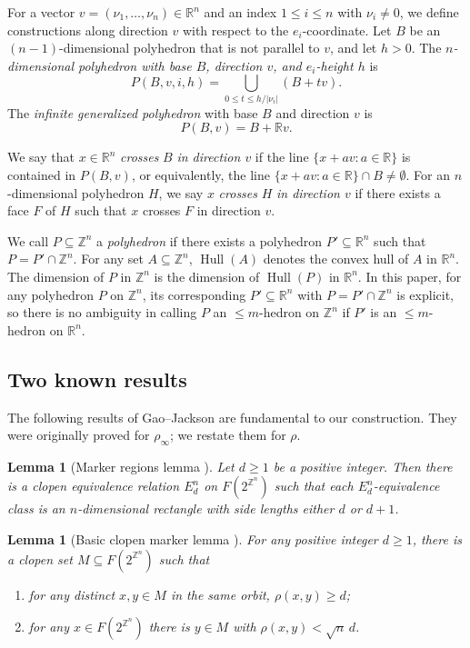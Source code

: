 \documentclass[10pt,a4paper]{amsart}
\newtheorem{lemma}[theorem]{Lemma}
\newcommand{\Z}{\mathbb Z}
\newcommand{\R}{\mathbb R}
\DeclareMathOperator{\Hull}{Hull}
\begin{document}
For a vector $v=(\nu_1,\dots,\nu_n)\in\mathbb{R}^n$ and an index
$1\leq i\leq n$ with $\nu_i\neq 0$, we define constructions along direction
$v$ with respect to the $e_i$-coordinate. Let $B$ be an $(n-1)$-dimensional
polyhedron that is not parallel to $v$, and let $h>0$. The {\em $n$-dimensional polyhedron with base $B$,
direction $v$, and $e_i$-height $h$} is
\[
P(B, v, i, h)=\bigcup_{0\leq t\leq h/|\nu_i|} (B+tv).
\]
The {\em infinite generalized polyhedron} with base $B$ and direction $v$ is
\[
P(B, v)=B+\mathbb{R}v.
\]

We say that $x\in\mathbb{R}^n$ {\em crosses} $B$ {\em in direction $v$} if
the line $\{x+av\colon a\in\mathbb{R}\}$ is contained in $P(B,v)$, or equivalently, the line $\{x+av\colon a\in\mathbb{R}\}\cap B\neq\emptyset$. For an
$n$-dimensional polyhedron $H$, we say $x$ {\em crosses} $H$ {\em in
direction $v$} if there exists a face $F$ of $H$ such that $x$ crosses $F$
in direction $v$.

We call $P\subseteq\mathbb{Z}^n$ a {\em polyhedron} if there exists a polyhedron $P'\subseteq\mathbb{R}^n$ such that $P=P'\cap\mathbb{Z}^n$. For any set $A\subseteq\mathbb{Z}^n$,
$\Hull(A)$ denotes the convex hull of $A$ in $\mathbb{R}^n$. The dimension of $P$ in $\Z^n$ is the dimension of $\Hull(P)$ in $\R^n$. In this paper, for any polyhedron $P$ on $\Z^n$, its corresponding $P'\subseteq\R^n$ with $P=P'\cap\Z^n$ is explicit, so there is no ambiguity in calling $P$ an $\leq\!\! m$-hedron on $\Z^n$ if $P'$ is an $\leq\!\! m$-hedron on $\R^n$.

\subsection{Two known results}

The following results of Gao--Jackson \cite{GJ15} are fundamental
to our construction. They were originally proved for $\rho_\infty$; we restate them for $\rho$.

\begin{lemma}[Marker regions lemma {\cite[Theorem 3.1]{GJ15}}]\label{lem:markerregions}
Let $d\geq 1$ be a positive integer. Then there is a clopen equivalence
relation $E_d^n$ on $F(2^{\mathbb{Z}^n})$ such that each $E_d^n$-equivalence
class is an $n$-dimensional rectangle with side lengths either $d$ or $d+1$.
\end{lemma}

\begin{lemma}[Basic clopen marker lemma {\cite[Lemma 2.1]{GJ15}}]\label{lem:basicmarker}
For any positive integer $d\geq 1$, there is a clopen set
$M\subseteq F(2^{\mathbb{Z}^n})$ such that
\begin{enumerate}
\item[(1)] for any distinct $x, y\in M$ in the same orbit,
$\rho(x,y)\geq d$;
\item[(2)] for any $x\in F(2^{\mathbb{Z}^n})$ there is $y\in M$ with
$\rho(x,y)< \sqrt{n}\,d$.
\end{enumerate}
\end{lemma}
\end{document}

